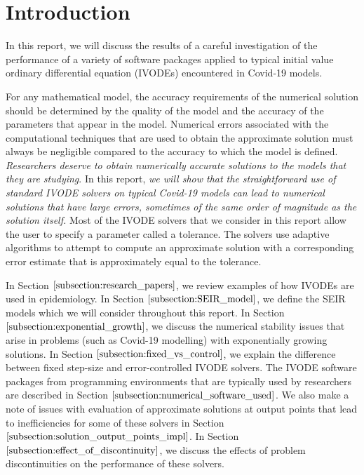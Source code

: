 \section{Introduction}
\label{section:intro}
In this report, we will discuss the results of a careful investigation of the performance of a variety of software packages applied to typical initial value ordinary differential equation (IVODEs) encountered in Covid-19 models. 

For any mathematical model, the accuracy requirements of the numerical solution should be determined by the quality of the model and the accuracy of the parameters that appear in the model. Numerical errors associated with the computational techniques that are used to obtain the approximate solution must always be negligible compared to the accuracy to which the model is defined. \emph{Researchers deserve to obtain numerically accurate solutions to the models that they are studying}. In this report, \emph{we will show that the straightforward use of standard IVODE solvers on typical Covid-19 models can lead to numerical solutions that have large errors, sometimes of the same order of magnitude as the solution itself.} Most of the IVODE solvers that we consider in this report allow the user to specify a parameter called a tolerance. The solvers use adaptive algorithms to attempt to compute an approximate solution with a corresponding error estimate that is approximately equal to the tolerance.

In Section $\ref{subsection:research_papers}$, we review examples of how IVODEs are used in epidemiology. In Section $\ref{subsection:SEIR_model}$, we define the SEIR models which we will consider throughout this report. In Section $\ref{subsection:exponential_growth}$, we discuss the numerical stability issues that arise in problems (such as Covid-19 modelling) with exponentially growing solutions. In Section $\ref{subsection:fixed_vs_control}$, we explain the difference between fixed step-size and error-controlled IVODE solvers. The IVODE software packages from programming environments that are typically used by researchers are described in Section $\ref{subsection:numerical_software_used}$. We also make a note of issues with evaluation of approximate solutions at output points that lead to inefficiencies for some of these solvers in Section $\ref{subsection:solution_output_points_impl}$. In Section $\ref{subsection:effect_of_discontinuity}$, we discuss the effects of problem discontinuities on the performance of these solvers.

